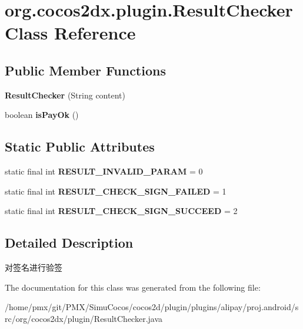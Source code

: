 \hypertarget{classorg_1_1cocos2dx_1_1plugin_1_1ResultChecker}{}\section{org.\+cocos2dx.\+plugin.\+Result\+Checker Class Reference}
\label{classorg_1_1cocos2dx_1_1plugin_1_1ResultChecker}
\subsection*{Public Member Functions}
\begin{DoxyCompactItemize}
\item 
\mbox{\label{classorg_1_1cocos2dx_1_1plugin_1_1ResultChecker_a18ac51375d758bccd6717eabbe23a112}} 
{\bfseries Result\+Checker} (String content)
\item 
\mbox{\label{classorg_1_1cocos2dx_1_1plugin_1_1ResultChecker_a111ef53929f028c51e7dcdd8b15ad8b0}} 
boolean {\bfseries is\+Pay\+Ok} ()
\end{DoxyCompactItemize}
\subsection*{Static Public Attributes}
\begin{DoxyCompactItemize}
\item 
\mbox{\label{classorg_1_1cocos2dx_1_1plugin_1_1ResultChecker_a6ba958ce8216577882463539a876483b}} 
static final int {\bfseries R\+E\+S\+U\+L\+T\+\_\+\+I\+N\+V\+A\+L\+I\+D\+\_\+\+P\+A\+R\+AM} = 0
\item 
\mbox{\label{classorg_1_1cocos2dx_1_1plugin_1_1ResultChecker_a5de893222ca116dad2630252d349df97}} 
static final int {\bfseries R\+E\+S\+U\+L\+T\+\_\+\+C\+H\+E\+C\+K\+\_\+\+S\+I\+G\+N\+\_\+\+F\+A\+I\+L\+ED} = 1
\item 
\mbox{\label{classorg_1_1cocos2dx_1_1plugin_1_1ResultChecker_ab86a9d4a2ba482e33a39b8c297f69ac6}} 
static final int {\bfseries R\+E\+S\+U\+L\+T\+\_\+\+C\+H\+E\+C\+K\+\_\+\+S\+I\+G\+N\+\_\+\+S\+U\+C\+C\+E\+ED} = 2
\end{DoxyCompactItemize}


\subsection{Detailed Description}
对签名进行验签 

The documentation for this class was generated from the following file\+:\begin{DoxyCompactItemize}
\item 
/home/pmx/git/\+P\+M\+X/\+Simu\+Cocos/cocos2d/plugin/plugins/alipay/proj.\+android/src/org/cocos2dx/plugin/Result\+Checker.\+java\end{DoxyCompactItemize}

